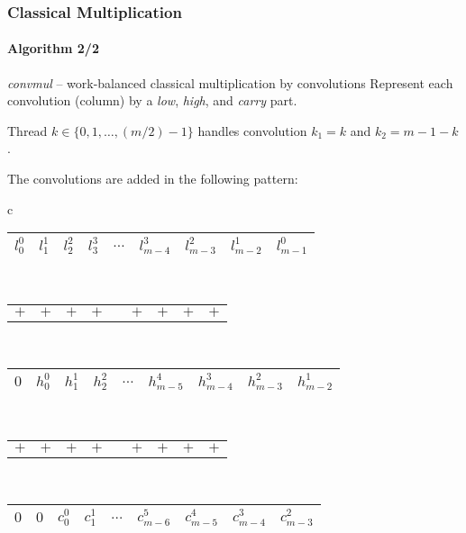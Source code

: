 \begin{frame}[fragile]
  \frametitle{Classical Multiplication}
  \framesubtitle{Algorithm 2/2}
  \begin{block}{\textit{convmul} -- work-balanced classical multiplication by convolutions}\scriptsize
    Represent each convolution (column) by a \textit{low}, \textit{high}, and \textit{carry} part.\\

    \phantom{~}

    Thread $k\in \{0,1,\ldots,(m/2)-1\}$ handles convolution $k_1=k$ and $k_2=m-1-k$.

    \phantom{~}

    The convolutions are added in the following pattern:

    \phantom{~}

  \begin{center}
  \scriptsize
  \begin{tabular}{c}
    \begin{tabular}{|C{0.75cm}|C{0.75cm}|C{0.75cm}|C{0.75cm}|C{0.35cm}|C{0.75cm}|C{0.75cm}|C{0.75cm}|C{0.75cm}|}
      \hline
      \red $l^0_0$ & \blue $l^1_1$ & \green $l^2_2$ & \brown $l^3_3$ & $\ldots$ & \brown $l^3_{m-4}$ & \green $l^2_{m-3}$ & \blue $l^1_{m-2}$ & \red $l^0_{m-1}$\\
      \hline
    \end{tabular}\\
    \begin{tabular}{C{0.76cm}C{0.76cm}C{0.76cm}C{0.76cm}C{0.36cm}C{0.76cm}C{0.76cm}C{0.76cm}C{0.76cm}}
      $+$ & $+$ & $+$ & $+$ &  & $+$ & $+$ & $+$ & $+$
    \end{tabular}\\
    \begin{tabular}{|C{0.75cm}|C{0.75cm}|C{0.75cm}|C{0.75cm}|C{0.35cm}|C{0.75cm}|C{0.75cm}|C{0.75cm}|C{0.75cm}|}
      \hline
      $0$ & \red $h^0_0$ & \blue $h^1_1$ & \green $h^2_2$ & $\ldots$ & \color{magenta} $h^{4}_{m-5}$ & \brown $h^{3}_{m-4}$ & \green $h^{2}_{m-3}$ & \blue $h^1_{m-2}$\\
      \hline
    \end{tabular}\\
    \begin{tabular}{C{0.76cm}C{0.76cm}C{0.76cm}C{0.76cm}C{0.36cm}C{0.76cm}C{0.76cm}C{0.76cm}C{0.76cm}}
      $+$ & $+$ & $+$ & $+$ &  & $+$ & $+$ & $+$ & $+$
    \end{tabular}\\
    \begin{tabular}{|C{0.75cm}|C{0.75cm}|C{0.75cm}|C{0.75cm}|C{0.35cm}|C{0.75cm}|C{0.75cm}|C{0.75cm}|C{0.75cm}|}
      \hline
      $0$ & $0$ & \red $c^{0}_0$ & \blue $c^{1}_1$ & $\ldots$ & \color{cyan} $c^{5}_{m-6}$ & \color{magenta} $c^{4}_{m-5}$ & \brown $c^{3}_{m-4}$ & \green $c^{2}_{m-3}$\\
      \hline
    \end{tabular}
  \end{tabular}
\end{center}
    \end{block}
\end{frame}

